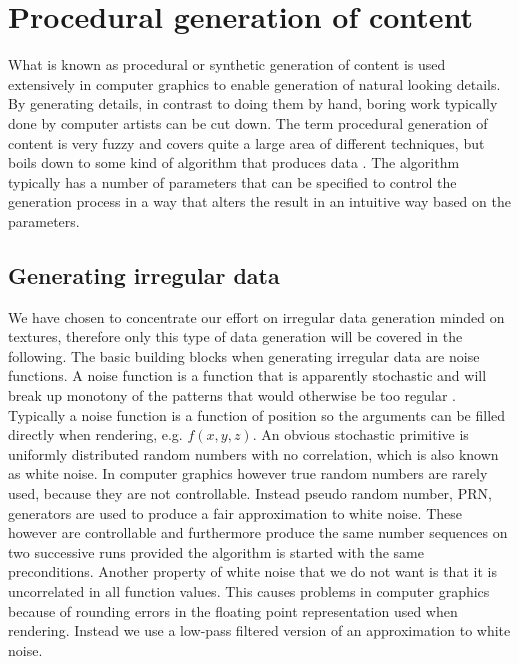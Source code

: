 
\chapter{Procedural generation of content}
\label{chap:noise}
What is known as procedural or synthetic generation of content is
used extensively in computer graphics to enable generation of natural
looking details. By generating details, in contrast to doing them by
hand, boring work typically done by computer artists can be cut down.
%
The term procedural generation of content is very fuzzy and covers
quite a large area of different techniques, but boils down to some
kind of algorithm that produces data .
The algorithm typically has a number of parameters that can be
specified to control the generation process in a way that alters the
result in an intuitive way based on the parameters.

\section{Generating irregular data}
We have chosen to concentrate our effort on irregular data generation
minded on textures, therefore only this type of data generation
will be covered in the following.
%
The basic building blocks when generating irregular data are
noise functions. A noise function is a function that is apparently
stochastic and will break up monotony of the patterns that would
otherwise be too regular .
%
Typically a noise function is a function of position so the arguments
can be filled directly when rendering, e.g. $f(x,y,z)$.
%
An obvious stochastic primitive is uniformly distributed random
numbers with no correlation, which is also known as white noise.
In computer graphics however true random numbers are rarely used,
because they are not controllable.
Instead pseudo random number, PRN, generators are used to produce a
fair approximation to white noise. These however are controllable and
furthermore produce the same number sequences on two successive runs
provided the algorithm is started with the same preconditions.
%
Another property of white noise that we do not want is that it is
uncorrelated in all function values. This causes problems in computer
graphics because of rounding errors in the floating point
representation used when rendering. Instead we use a low-pass filtered
version of an approximation to white noise.

